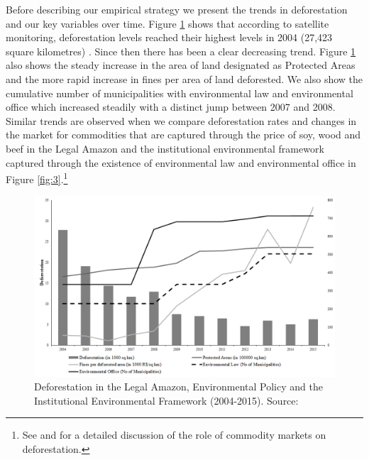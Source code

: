 Before describing our empirical strategy we present the trends in deforestation and our key variables over time. Figure \ref{fig:2} shows that according to satellite monitoring, deforestation levels reached their highest levels in 2004 (27,423 square kilometres) \citep{MMMAwebsite}.  Since then there has been a clear decreasing trend. Figure \ref{fig:2} also shows the steady increase in the area of land designated as Protected Areas and the more rapid increase in fines per area of land deforested. We also show the cumulative number of municipalities with environmental law and environmental office which increased steadily with a distinct jump between 2007 and 2008. Similar trends are observed when we compare deforestation rates and changes in the market for commodities that are captured through the price of soy, wood and beef in the Legal Amazon and the institutional environmental framework captured through the existence of environmental law and environmental office in Figure \ref{fig:3}.\footnote{See \citet{hargrave_kis-katos_2012} and \citet{LAKES} for a detailed discussion of the role of commodity markets on deforestation.}


\begin{figure}[H]
  \centering
  \includegraphics[width=1\textwidth, inner]{Figure1_policy.png}
\caption{Deforestation in the Legal Amazon, Environmental Policy and the Institutional Environmental Framework (2004-2015). Source: \citep{inpe, MMMAwebsite, IBAMAwebsite}}
\label{fig:2}
\end{figure}

